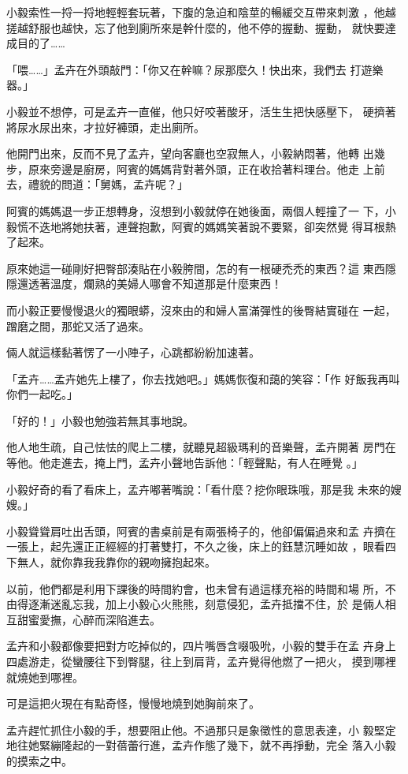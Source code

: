小毅索性一捋一捋地輕輕套玩著，下腹的急迫和陰莖的暢緩交互帶來刺激
，他越搓越舒服也越快，忘了他到廁所來是幹什麼的，他不停的握動、握動，
就快要達成目的了……

「喂……」孟卉在外頭敲門：「你又在幹嘛？尿那麼久！快出來，我們去
打遊樂器。」

小毅並不想停，可是孟卉一直催，他只好咬著酸牙，活生生把快感壓下，
硬擠著將尿水尿出來，才拉好褲頭，走出廁所。

他開門出來，反而不見了孟卉，望向客廳也空寂無人，小毅納悶著，他轉
出幾步，原來旁邊是廚房，阿賓的媽媽背對著外頭，正在收拾著料理台。他走
上前去，禮貌的問道：「舅媽，孟卉呢？」

阿賓的媽媽退一步正想轉身，沒想到小毅就停在她後面，兩個人輕撞了一
下，小毅慌不迭地將她扶著，連聲抱歉，阿賓的媽媽笑著說不要緊，卻突然覺
得耳根熱了起來。

原來她這一碰剛好把臀部湊貼在小毅胯間，怎的有一根硬禿禿的東西？這
東西隱隱還透著溫度，爛熟的美婦人哪會不知道那是什麼東西！

而小毅正要慢慢退火的獨眼蟒，沒來由的和婦人富滿彈性的後臀結實碰在
一起，蹭磨之間，那蛇又活了過來。

倆人就這樣黏著愣了一小陣子，心跳都紛紛加速著。

「孟卉……孟卉她先上樓了，你去找她吧。」媽媽恢復和藹的笑容：「作
好飯我再叫你們一起吃。」

「好的！」小毅也勉強若無其事地說。

他人地生疏，自己怯怯的爬上二樓，就聽見超級瑪利的音樂聲，孟卉開著
房門在等他。他走進去，掩上門，孟卉小聲地告訴他：「輕聲點，有人在睡覺
。」

小毅好奇的看了看床上，孟卉嘟著嘴說：「看什麼？挖你眼珠哦，那是我
未來的嫂嫂。」

小毅聳聳肩吐出舌頭，阿賓的書桌前是有兩張椅子的，他卻偏偏過來和孟
卉擠在一張上，起先還正正經經的打著雙打，不久之後，床上的鈺慧沉睡如故
，眼看四下無人，就你靠我我靠你的親吻擁抱起來。

以前，他們都是利用下課後的時間約會，也未曾有過這樣充裕的時間和場
所，不由得逐漸迷亂忘我，加上小毅心火熊熊，刻意侵犯，孟卉抵擋不住，於
是倆人相互甜蜜愛撫，心醉而深陷進去。

孟卉和小毅都像要把對方吃掉似的，四片嘴唇含啜吸吮，小毅的雙手在孟
卉身上四處游走，從蠻腰往下到臀腿，往上到肩背，孟卉覺得他燃了一把火，
摸到哪裡就燒她到哪裡。

可是這把火現在有點奇怪，慢慢地燒到她胸前來了。

孟卉趕忙抓住小毅的手，想要阻止他。不過那只是象徵性的意思表達，小
毅堅定地往她緊繃隆起的一對蓓蕾行進，孟卉作態了幾下，就不再掙動，完全
落入小毅的摸索之中。


